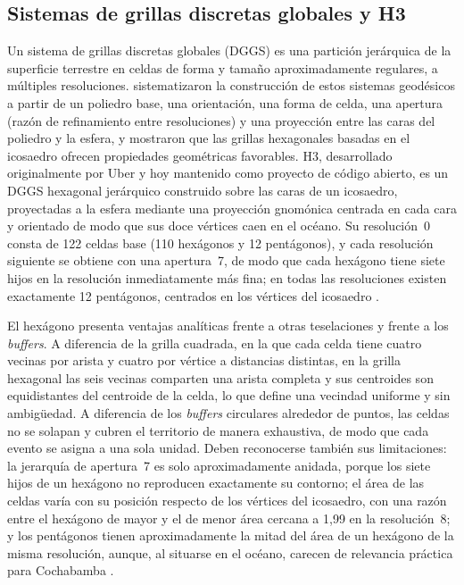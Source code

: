 \subsection{Sistemas de grillas discretas globales y H3}
\label{subsec:h3}

Un sistema de grillas discretas globales (DGGS) es una partición jerárquica de la superficie
terrestre en celdas de forma y tamaño aproximadamente regulares, a múltiples resoluciones.
\textcite{sahr2003} sistematizaron la construcción de estos sistemas geodésicos a partir de
un poliedro base, una orientación, una forma de celda, una apertura (razón de refinamiento
entre resoluciones) y una proyección entre las caras del poliedro y la esfera, y mostraron
que las grillas hexagonales basadas en el icosaedro ofrecen propiedades geométricas
favorables. H3, desarrollado originalmente por Uber y hoy mantenido como proyecto de código
abierto, es un DGGS hexagonal jerárquico construido sobre las caras de un icosaedro,
proyectadas a la esfera mediante una proyección gnomónica centrada en cada cara y orientado
de modo que sus doce vértices caen en el océano. Su resolución~0 consta de 122 celdas base
(110 hexágonos y 12 pentágonos), y cada resolución siguiente se obtiene con una apertura~7,
de modo que cada hexágono tiene siete hijos en la resolución inmediatamente más fina; en
todas las resoluciones existen exactamente 12 pentágonos, centrados en los vértices del
icosaedro \parencite{h3-overview,h3-restable}.

El hexágono presenta ventajas analíticas frente a otras teselaciones y frente a los
\textit{buffers}. A diferencia de la grilla cuadrada, en la que cada celda tiene cuatro
vecinas por arista y cuatro por vértice a distancias distintas, en la grilla hexagonal las
seis vecinas comparten una arista completa y sus centroides son equidistantes del centroide
de la celda, lo que define una vecindad uniforme y sin ambigüedad. A diferencia de los
\textit{buffers} circulares alrededor de puntos, las celdas no se solapan y cubren el
territorio de manera exhaustiva, de modo que cada evento se asigna a una sola unidad. Deben
reconocerse también sus limitaciones: la jerarquía de apertura~7 es solo aproximadamente
anidada, porque los siete hijos de un hexágono no reproducen exactamente su contorno; el
área de las celdas varía con su posición respecto de los vértices del icosaedro, con una
razón entre el hexágono de mayor y el de menor área cercana a 1,99 en la resolución~8; y los
pentágonos tienen aproximadamente la mitad del área de un hexágono de la misma resolución,
aunque, al situarse en el océano, carecen de relevancia práctica para Cochabamba
\parencite{h3-restable}.

